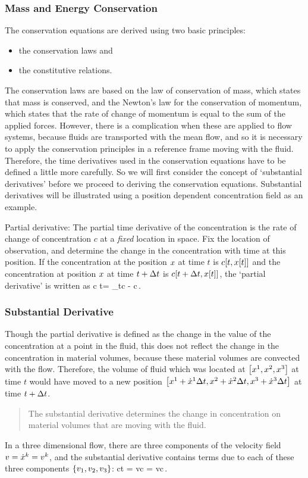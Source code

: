 \subsubsection{Mass and Energy Conservation}
The conservation equations are derived using two basic principles: 
\begin{itemize}
\item the conservation laws and 
\item the constitutive relations.
\end{itemize}
The conservation laws are based on the law of conservation of mass, which states that mass is conserved, and the Newton's law for the conservation of momentum, which states that the rate of change of momentum is equal to the sum of the applied forces. However, there is a complication when these are applied to flow systems, because fluids are transported with the mean flow, and so it is necessary to apply the conservation principles in a reference frame moving with the fluid. Therefore, the time derivatives used in the conservation equations have to be defined a little more carefully. So we will first consider the concept of `substantial derivatives' before we proceed to deriving the conservation equations. Substantial derivatives will be illustrated using a position dependent concentration field as an example.

Partial derivative: The partial time derivative of the concentration is the rate of change of concentration $c$ at a \emph{fixed} location in space. Fix the location of observation, and determine the change in the concentration with time at this position. If the concentration at the position $x$ at time $t$ is $c\!\left[{t, x\!\left[{t}\right]}\right]$ and the concentration at position $x$ at time $t + \Delta t$ is $c\!\left[{t + \Delta t, x\!\left[{t}\right]}\right]$, the `partial derivative' is written as
\beq
\xpd c t\vattpvec = \lim_{\diff t}c - c\vattpvec\,.
\eeq


\subsubsection{Substantial Derivative}
Though the partial derivative is defined as the change in the value of the concentration at a point in the fluid, this does not reflect the change in the concentration in material volumes, because these material volumes are convected with the flow. Therefore, the volume of fluid which was located at $\left[{{x}^{1}, {x}^{2}, {x}^{3}}\right]$ at time $t$ would have moved to a new position $\left[{{x}^{1} + \dot{x}^{1}\Delta t, {x}^{2} + \dot{x}^{2}\Delta t, {x}^{3} + \dot{x}^{3}\Delta t}\right]$ at time $t + \Delta t$. 
\begin{quote}
The substantial derivative determines the change in concentration on material volumes that are moving with the fluid.
\end{quote}
In a three dimensional flow, there are three components of the velocity field $v = \dot{x}^{k} = {v}^{k}$, and the substantial derivative contains terms due to each of these three components $\left\lbrace{v_1, v_2, v_3}\right\rbrace$:
\beq
\mder ct = v\iprod\gder c = v\iprod\grad c\,.
\eeq

